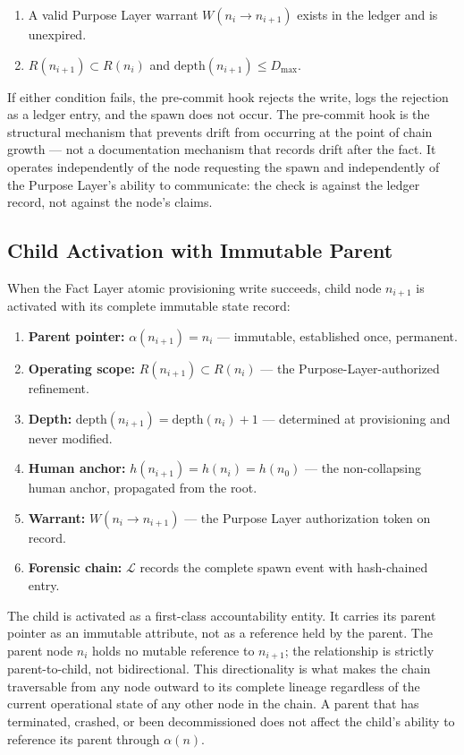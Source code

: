 \begin{enumerate}
    \item[(PH1)] A valid Purpose Layer warrant $W(n_i \to n_{i+1})$ exists in the ledger and is unexpired.
    \item[(PH2)] $R(n_{i+1}) \subset R(n_i)$ and $\mathrm{depth}(n_{i+1}) \leq D_{\max}$.
\end{enumerate}

If either condition fails, the pre-commit hook rejects the write, logs the rejection as a ledger entry, and the spawn does not occur. The pre-commit hook is the structural mechanism that prevents drift from occurring at the point of chain growth --- not a documentation mechanism that records drift after the fact. It operates independently of the node requesting the spawn and independently of the Purpose Layer's ability to communicate: the check is against the ledger record, not against the node's claims.

\subsection{Child Activation with Immutable Parent}
\label{sec:rsp-child-activation}

When the Fact Layer atomic provisioning write succeeds, child node $n_{i+1}$ is activated with its complete immutable state record:

\begin{enumerate}
    \item \textbf{Parent pointer:} $\alpha(n_{i+1}) = n_i$ --- immutable, established once, permanent.
    \item \textbf{Operating scope:} $R(n_{i+1}) \subset R(n_i)$ --- the Purpose-Layer-authorized refinement.
    \item \textbf{Depth:} $\mathrm{depth}(n_{i+1}) = \mathrm{depth}(n_i) + 1$ --- determined at provisioning and never modified.
    \item \textbf{Human anchor:} $h(n_{i+1}) = h(n_i) = h(n_0)$ --- the non-collapsing human anchor, propagated from the root.
    \item \textbf{Warrant:} $W(n_i \to n_{i+1})$ --- the Purpose Layer authorization token on record.
    \item \textbf{Forensic chain:} $\mathcal{L}$ records the complete spawn event with hash-chained entry.
\end{enumerate}

The child is activated as a first-class accountability entity. It carries its parent pointer as an immutable attribute, not as a reference held by the parent. The parent node $n_i$ holds no mutable reference to $n_{i+1}$; the relationship is strictly parent-to-child, not bidirectional. This directionality is what makes the chain traversable from any node outward to its complete lineage regardless of the current operational state of any other node in the chain. A parent that has terminated, crashed, or been decommissioned does not affect the child's ability to reference its parent through $\alpha(n)$.

